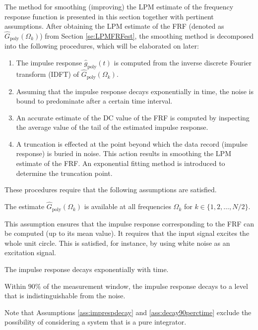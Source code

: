 The method for smoothing (improving) the LPM estimate of the frequency response function  is presented in this section together with pertinent assumptions. After obtaining the LPM estimate of the FRF (denoted as $\hat{G}_{\mathrm{poly}}(\Omega_k)$) from Section \ref{se:LPMFRFest}, the smoothing method is decomposed into the following procedures, which will be elaborated on later:
\begin{enumerate}
\item The impulse response $\hat g_\mathrm{poly}(t)$  is computed from the inverse discrete Fourier transform (IDFT) of $\hat{G}_{\mathrm{poly}}(\Omega_k)$.

\item
Assuming that the impulse response decays exponentially in time, the noise is bound to predominate after a certain time interval. 

\item
An accurate estimate of the DC value of the FRF is computed by inspecting the average value of the tail of the estimated impulse response.

\item
A truncation is effected at the point beyond which the data record (impulse response) is buried in noise. 
This action results in smoothing the LPM estimate of the FRF. An exponential fitting method is introduced to determine the truncation point.
\end{enumerate}


These procedures require that the following assumptions are satisfied.

\begin{assumption}
The estimate $\hat G_\mathrm{poly}(\Omega_k)$ is available at all frequencies $\Omega_k$ for $k\in\{1,2,\dots,N/2\}$.
\end{assumption}

This assumption ensures that the impulse response corresponding to the FRF can be computed (up to its mean value). It requires that the input signal excites the whole unit circle. This is satisfied, for instance, by using white noise as an excitation signal.

\begin{assumption}\label{ass:imprespdecay}
The impulse response decays exponentially with time.
\end{assumption}

\begin{assumption}\label{ass:decay90perctime}
Within $90\%$ of the measurement window, the impulse response decays 
 to a level that is indistinguishable from the noise. 
\end{assumption}

Note that Assumptions \ref{ass:imprespdecay} and \ref{ass:decay90perctime} exclude the possibility of considering a system that is a pure integrator.
